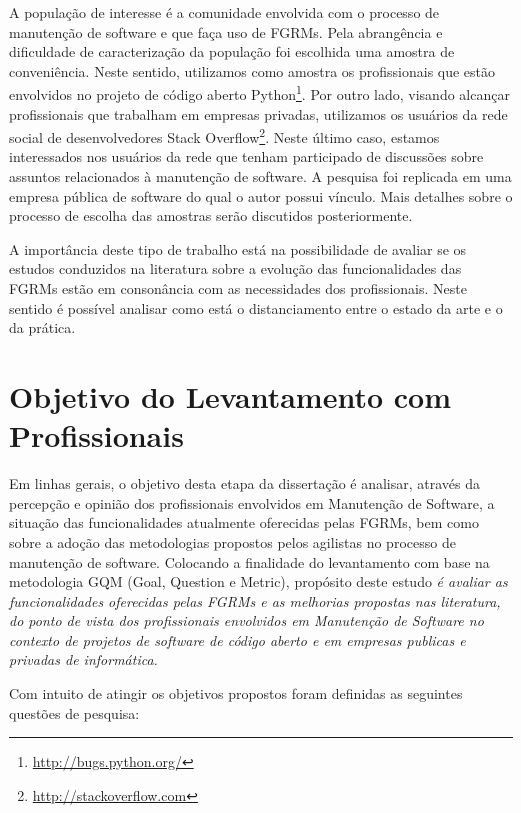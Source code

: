 A população de interesse é a comunidade envolvida com o processo de manutenção
de software e que faça uso de FGRMs. Pela abrangência e dificuldade de
caracterização da população foi escolhida uma amostra de conveniência. Neste
sentido, utilizamos como amostra os profissionais que estão envolvidos no
projeto de código aberto Python\footnote{\url{http://bugs.python.org/}}. Por
outro lado, visando alcançar profissionais que trabalham em empresas privadas,
utilizamos os usuários da rede social de desenvolvedores Stack
Overflow\footnote{\url{http://stackoverflow.com}}. Neste último caso, estamos
interessados nos usuários da rede que tenham participado de discussões sobre
assuntos relacionados à manutenção de software. A pesquisa foi replicada em uma
empresa pública de software do qual o autor possui vínculo. Mais detalhes sobre
o processo de escolha das amostras serão discutidos posteriormente.

A importância deste tipo de trabalho está na possibilidade de avaliar se os
estudos conduzidos na literatura sobre a evolução das funcionalidades das FGRMs
estão em consonância com as necessidades dos profissionais. Neste sentido é
possível analisar como está o distanciamento entre o estado da arte e o da
prática.

\section{Objetivo do Levantamento com Profissionais}
\label{sec:objetivo_da_pesquisa_com_profissionais}

Em linhas gerais, o objetivo desta etapa da dissertação é analisar, através da
percepção e opinião dos profissionais envolvidos em Manutenção de Software, a
situação das funcionalidades atualmente oferecidas pelas FGRMs, bem como sobre a
adoção das metodologias propostos pelos agilistas no processo de manutenção de
software. Colocando a finalidade do levantamento com base na metodologia
GQM (Goal, Question e Metric)\cite{gqm},  propósito deste estudo \textit{é
    avaliar as funcionalidades oferecidas pelas FGRMs e as melhorias propostas
    nas literatura, do ponto de vista dos profissionais envolvidos em Manutenção
    de Software no contexto de projetos de software de código aberto e em
    empresas publicas e privadas de informática.}

Com intuito de atingir os objetivos propostos foram definidas as seguintes
questões de pesquisa:

